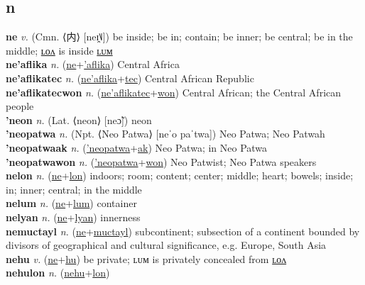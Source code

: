 \subsection{n}

\textbf{ne} \textit{v.} (Cmn. ⟨内⟩ [neɪ̯˥˩])
be inside; be in; contain; be inner; be central; be in the middle; \hyperref[nelon]{ʟᴏᴧ} is inside \hyperref[nelum]{ʟᴜᴍ} \label{ne} \\
\textbf{ne'aflika} \textit{n.} (\hyperref[ne]{ne}+\hyperref['aflika]{'aflika})
Central Africa \label{ne'aflika} \\
\textbf{ne'aflikatec} \textit{n.} (\hyperref[ne'aflika]{ne'aflika}+\hyperref[tec]{tec})
Central African Republic \label{ne'aflikatec} \\
\textbf{ne'aflikatecwon} \textit{n.} (\hyperref[ne'aflikatec]{ne'aflikatec}+\hyperref[won]{won})
Central African; the Central African people \label{ne'aflikatecwon} \\
\textbf{'neon} \textit{n.} (Lat. ⟨neon⟩ [neɔ̃])
neon \label{'neon} \\
\textbf{'neopatwa} \textit{n.} (Npt. ⟨Neo Patwa⟩ [neˈo paˈtwa])
Neo Patwa; Neo Patwah \label{'neopatwa} \\
\textbf{'neopatwaak} \textit{n.} (\hyperref['neopatwa]{'neopatwa}+\hyperref[ak]{ak})
Neo Patwa; in Neo Patwa \label{'neopatwaak} \\
\textbf{'neopatwawon} \textit{n.} (\hyperref['neopatwa]{'neopatwa}+\hyperref[won]{won})
Neo Patwist; Neo Patwa speakers \label{'neopatwawon} \\
\textbf{nelon} \textit{n.} (\hyperref[ne]{ne}+\hyperref[lon]{lon})
indoors; room; content; center; middle; heart; bowels; inside; in; inner; central; in the middle \label{nelon} \\
\textbf{nelum} \textit{n.} (\hyperref[ne]{ne}+\hyperref[lum]{lum})
container \label{nelum} \\
\textbf{nelyan} \textit{n.} (\hyperref[ne]{ne}+\hyperref[lyan]{lyan})
innerness \label{nelyan} \\
\textbf{nemuctayl} \textit{n.} (\hyperref[ne]{ne}+\hyperref[muctayl]{muctayl})
subcontinent; subsection of a continent bounded by divisors of geographical and cultural significance, e.g. Europe, South Asia \label{nemuctayl} \\
\textbf{nehu} \textit{v.} (\hyperref[ne]{ne}+\hyperref[hu]{hu})
be private; ʟᴜᴍ is privately concealed from \hyperref[nehulon]{ʟᴏᴧ} \label{nehu} \\
\textbf{nehulon} \textit{n.} (\hyperref[nehu]{nehu}+\hyperref[lon]{lon})
